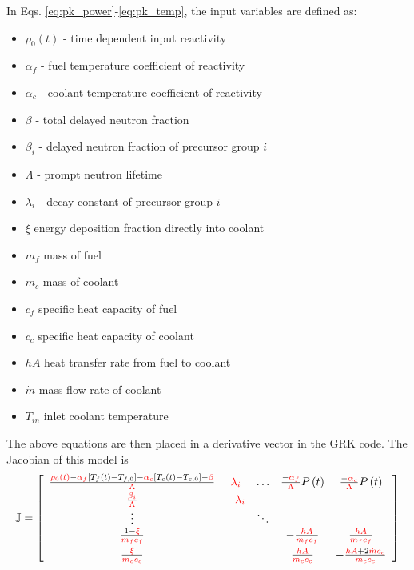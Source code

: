 \documentclass{ansconf}
\numberwithin{equation}{section}
\begin{document}
In Eqs. \eqref{eq:pk_power}-\eqref{eq:pk_temp}, the input variables are defined as:
\begin{itemize}
	\item $\rho_0\left(t\right)$ - time dependent input reactivity
	\item $\alpha_f$ - fuel temperature coefficient of reactivity
	\item $\alpha_c$ - coolant temperature coefficient of reactivity
	\item $\beta$ - total delayed neutron fraction
	\item $\beta_i$ - delayed neutron fraction of precursor group $i$
	\item $\Lambda$ - prompt neutron lifetime
	\item $\lambda_i$ - decay constant of precursor group $i$
	\item $\xi$ energy deposition fraction directly into coolant
	\item $m_f$ mass of fuel
	\item $m_c$ mass of coolant
	\item $c_f$ specific heat capacity of fuel
	\item $c_c$ specific heat capacity of coolant
	\item $hA$ heat transfer rate from fuel to coolant
	\item $\dot{m}$ mass flow rate of coolant
	\item $T_{in}$ inlet coolant temperature
\end{itemize}
The above equations are then placed in a derivative vector in the GRK code. The Jacobian of this model is
  \begin{equation}
    \mathbb{J} = \left[
    \begin{array}{ccccc}
      \frac{{\color{red}\rho_0\left(t\right)} - {\color{red}\alpha_f}\left[T_f\left(t\right) - T_{f,0}\right] - {\color{red}\alpha_c}\left[T_c\left(t\right) - 
    T_{c,0}\right]- {\color{red}{\beta}}}{{\color{red}\Lambda}} & \color{red}\lambda_i & \hdots & \frac{-\color{red}\alpha_f}{\color{red}\Lambda}P\left(t\right) 
    & \frac{-\color{red}\alpha_c}{\color{red}\Lambda}P\left(t\right) \vspace{0.1cm}\\
    
    \frac{{\color{red}\beta_i}}{{\color{red}\Lambda}} & -{\color{red}\lambda_i} \\
    
    \vdots & & \ddots \\
    
    \frac{1-{\color{red}\xi}}{{\color{red}m_fc_f}} & & & -\frac{\color{red}hA}{\color{red}m_fc_f} & \frac{\color{red}hA}{\color{red}m_fc_f} \vspace{0.1cm} \\
    
    \frac{{\color{red}\xi}}{{\color{red}m_cc_c}} & & & \frac{\color{red}hA}{\color{red}m_cc_c} & -\frac{{\color{red}hA} + 2\color{red}\dot{m}c_c}{\color{red}m_cc_c}
    \end{array}\right]
  \end{equation}
\end{document}

